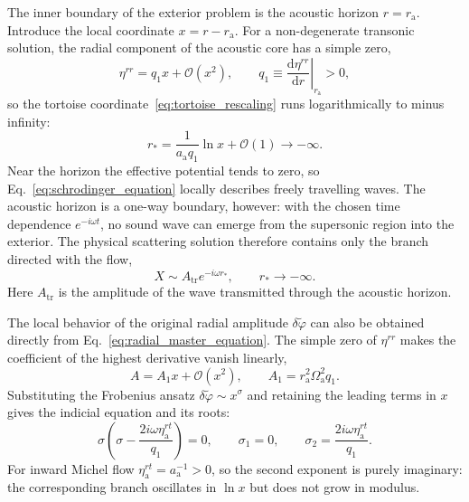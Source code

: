 \documentclass[12pt,a4paper,preprint,nopreprintline]{elsarticle}
\begin{document}
The inner boundary of the exterior problem is the acoustic horizon $r=r_{\mathrm{a}}$. Introduce the local coordinate $x=r-r_{\mathrm{a}}$. For a non-degenerate transonic solution, the radial component of the acoustic core has a simple zero,
\begin{equation}
    \eta^{rr}=q_{1}x+\mathcal{O}(x^{2}),
    \qquad
    q_{1}\equiv
    \left.\frac{\mathrm{d}\eta^{rr}}{\mathrm{d}r}\right|_{r_{\mathrm{a}}}
    >0,
    \label{eq:horizon_expansion}
\end{equation}
so the tortoise coordinate~\eqref{eq:tortoise_rescaling} runs logarithmically to minus infinity:
\begin{equation}
    r_{*}
    =
    \frac{1}{a_{\mathrm{a}}q_{1}}\ln x+\mathcal{O}(1)
    \longrightarrow-\infty.
    \label{eq:tortoise_horizon}
\end{equation}
Near the horizon the effective potential tends to zero, so Eq.~\eqref{eq:schrodinger_equation} locally describes freely travelling waves. The acoustic horizon is a one-way boundary, however: with the chosen time dependence $e^{-i\omega t}$, no sound wave can emerge from the supersonic region into the exterior. The physical scattering solution therefore contains only the branch directed with the flow,
\begin{equation}
    X\sim A_{\mathrm{tr}}e^{-i\omega r_{*}},
    \qquad r_{*}\rightarrow-\infty.
    \label{eq:horizon_boundary_condition}
\end{equation}
Here $A_{\mathrm{tr}}$ is the amplitude of the wave transmitted through the acoustic horizon.

The local behavior of the original radial amplitude $\delta\widetilde{\varphi}$ can also be obtained directly from Eq.~\eqref{eq:radial_master_equation}. The simple zero of $\eta^{rr}$ makes the coefficient of the highest derivative vanish linearly,
\begin{equation}
    A=A_{1}x+\mathcal{O}(x^{2}),
    \qquad
    A_{1}=r_{\mathrm{a}}^{2}\Omega_{\mathrm{a}}^{2}q_{1}.
\end{equation}
Substituting the Frobenius ansatz $\delta\widetilde{\varphi}\sim x^{\sigma}$ and retaining the leading terms in $x$ gives the indicial equation and its roots:
\begin{equation}
    \sigma
    \left(
        \sigma-\frac{2i\omega\eta^{rt}_{\mathrm{a}}}{q_{1}}
    \right)=0,
    \qquad
    \sigma_{1}=0,
    \qquad
    \sigma_{2}
    =
    \frac{2i\omega\eta^{rt}_{\mathrm{a}}}{q_{1}}.
    \label{eq:horizon_indicial}
\end{equation}
For inward Michel flow $\eta^{rt}_{\mathrm{a}}=a_{\mathrm{a}}^{-1}>0$, so the second exponent is purely imaginary: the corresponding branch oscillates in $\ln x$ but does not grow in modulus.
\end{document}
